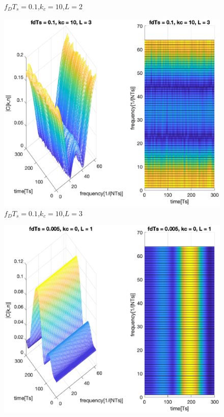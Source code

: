 \documentclass[conference]{IEEEtran}
\begin{document}
\begin{appendices}
\begin{figure}[H]
        \caption{$f_{D}T_{s}=0.1$,$k_{c}=10$,$L=2$}
        \label{01_10_2}
    \end{figure}
    \begin{figure}[H]
        \centering
        \includegraphics[width=\linewidth]{Task2/01_10_3.eps}
        \caption{$f_{D}T_{s}=0.1$,$k_{c}=10$,$L=3$}
        \label{01_10_3}
    \end{figure}
    \begin{figure}[H]
        \centering
        \includegraphics[width=\linewidth]{Task2/0005_0_1.eps}

\end{figure}
\end{appendices}
\end{document}
